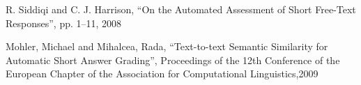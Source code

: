 \documentclass{article}
\begin{document}
\begin{thebibliography}{9}
R. Siddiqi and C. J. Harrison, ``On the Automated Assessment of Short
Free-Text Responses'',  pp. 1–11, 2008

Mohler, Michael and Mihalcea, Rada, ``Text-to-text Semantic Similarity for Automatic Short Answer Grading'', Proceedings of the 12th Conference of the European Chapter of the Association for Computational Linguistics,2009 




\end{thebibliography}
\end{document}
